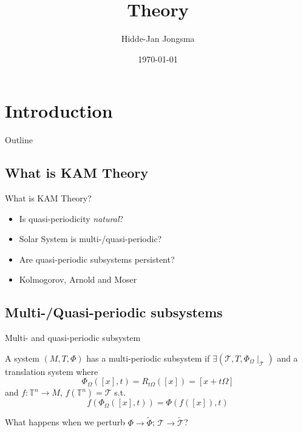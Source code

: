 \documentclass[]{beamer}
\title{\KAM Theory}
\author{ Hidde-Jan Jongsma }
\institute{ RuG }
\date{\today}
\newcommand{\T}{\mathbb{T}}
\newcommand{\rst}{\! \mid}
\begin{document}

\maketitle

\section{Introduction}

\begin{frame}{Outline}
    \small \tableofcontents
\end{frame}

\subsection{What is KAM Theory}

\begin{frame}{What is KAM Theory?}
    \begin{itemize}
        \item Is quasi-periodicity \emph{natural}?
        \item Solar System is multi-/quasi-periodic?
        \item Are quasi-periodic subsystems persistent?
        \item Kolmogorov, Arnold and Moser
    \end{itemize}
\end{frame}

\subsection{Multi-/Quasi-periodic subsystems}

\begin{frame}{Multi- and quasi-periodic subsystem}
    
    \begin{definition}
        A system $(M, T, \Phi)$ has a multi-periodic subsystem
        if $\exists (\mathcal{T}, T, \Phi_\Omega \rst_{\mathcal{T}})$ and a 
       translation system where
        \begin{equation*}
            \Phi_{\Omega}([x],t) = R_{t \Omega}([x]) = [x + t \Omega]
        \end{equation*}
        and $f : \T^n \rightarrow M$, $f(\T^n) = \mathcal{T}$ s.t.
        \begin{equation*}
            f(\Phi_{\Omega}([x],t)) = \Phi(f([x]), t)
        \end{equation*}
    \end{definition}
    
    \pause

    What happens when we perturb $\Phi \to \tilde{\Phi}$; $\mathcal{T} \to \tilde{\mathcal{T}}$?
    
\end{frame}
\end{document}
